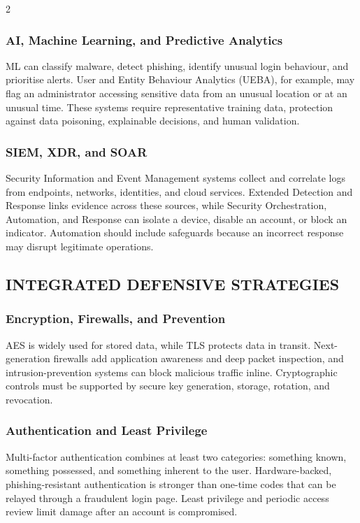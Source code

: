 \begin{multicols}{2}
  \subsubsection*{AI, Machine Learning, and Predictive Analytics}
  ML can classify malware, detect phishing, identify unusual login behaviour, and prioritise alerts. User and Entity Behaviour Analytics (UEBA), for example, may flag an administrator accessing sensitive data from an unusual location or at an unusual time. These systems require representative training data, protection against data poisoning, explainable decisions, and human validation.

  \subsubsection*{SIEM, XDR, and SOAR}
  Security Information and Event Management systems collect and correlate logs from endpoints, networks, identities, and cloud services. Extended Detection and Response links evidence across these sources, while Security Orchestration, Automation, and Response can isolate a device, disable an account, or block an indicator. Automation should include safeguards because an incorrect response may disrupt legitimate operations.

  \subsection*{\centering\uppercase{Integrated Defensive Strategies}}
  \subsubsection*{Encryption, Firewalls, and Prevention}
  AES is widely used for stored data, while TLS protects data in transit. Next-generation firewalls add application awareness and deep packet inspection, and intrusion-prevention systems can block malicious traffic inline. Cryptographic controls must be supported by secure key generation, storage, rotation, and revocation.

  \subsubsection*{Authentication and Least Privilege}
  Multi-factor authentication combines at least two categories: something known, something possessed, and something inherent to the user. Hardware-backed, phishing-resistant authentication is stronger than one-time codes that can be relayed through a fraudulent login page. Least privilege and periodic access review limit damage after an account is compromised.


\end{multicols}
